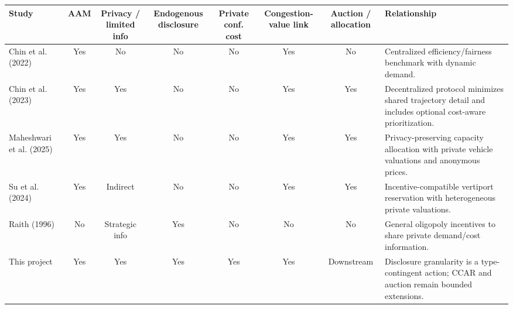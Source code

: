 \begin{center}
\captionsetup{hypcap=false}
\label{tab:literature}
\centering
\scriptsize
\begin{tabularx}{\textwidth}{@{}p{}ccccccY@{}}
\toprule
Study & AAM & Privacy / limited info & Endogenous disclosure & Private conf. cost & Congestion-value link & Auction / allocation & Relationship \\
\midrule
Chin et al. (2022) \cite{chin2022efficient} & Yes & No & No & No & Yes & No & Centralized efficiency/fairness benchmark with dynamic demand. \\
Chin et al. (2023) \cite{chin2023traffic} & Yes & Yes & No & No & Yes & Yes & Decentralized protocol minimizes shared trajectory detail and includes optional cost-aware prioritization. \\
Maheshwari et al. (2025) \cite{maheshwari2025privacy} & Yes & Yes & No & No & Yes & Yes & Privacy-preserving capacity allocation with private vehicle valuations and anonymous prices. \\
Su et al. (2024) \cite{su2024vertiport} & Yes & Indirect & No & No & Yes & Yes & Incentive-compatible vertiport reservation with heterogeneous private valuations. \\
Raith (1996) \cite{raith1996general} & No & Strategic info & Yes & No & No & No & General oligopoly incentives to share private demand/cost information. \\
This project & Yes & Yes & Yes & Yes & Yes & Downstream & Disclosure granularity is a type-contingent action; CCAR and auction remain bounded extensions. \\
\bottomrule
\end{tabularx}
\end{center}
